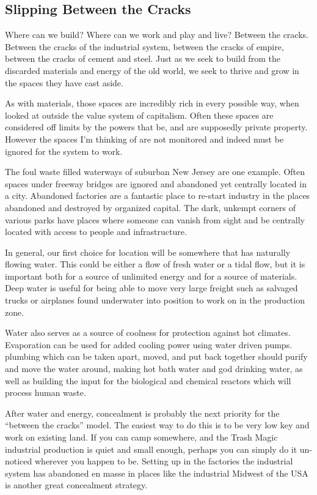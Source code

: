 \subsection{Slipping Between the
Cracks}\label{slipping-between-the-cracks}

Where can we build? Where can we work and play and live? Between the
cracks. Between the cracks of the industrial system, between the cracks
of empire, between the cracks of cement and steel. Just as we seek to
build from the discarded materials and energy of the old world, we seek
to thrive and grow in the spaces they have cast aside.

As with materials, those spaces are incredibly rich in every possible
way, when looked at outside the value system of capitalism. Often these
spaces are considered off limits by the powers that be, and are
supposedly private property. However the spaces I'm thinking of are not
monitored and indeed must be ignored for the system to work.

The foul waste filled waterways of suburban New Jersey are one example.
Often spaces under freeway bridges are ignored and abandoned yet
centrally located in a city. Abandoned factories are a fantastic place
to re-start industry in the places abandoned and destroyed by organized
capital. The dark, unkempt corners of various parks have places where
someone can vanish from sight and be centrally located with access to
people and infrastructure.

In general, our first choice for location will be somewhere that has
naturally flowing water. This could be either a flow of fresh water or a
tidal flow, but it is important both for a source of unlimited energy
and for a source of materials. Deep water is useful for being able to
move very large freight such as salvaged trucks or airplanes found
underwater into position to work on in the production zone.

Water also serves as a source of coolness for protection against hot
climates. Evaporation can be used for added cooling power using water
driven pumps. plumbing which can be taken apart, moved, and put back
together should purify and move the water around, making hot bath water
and god drinking water, as well as building the input for the biological
and chemical reactors which will process human waste.

After water and energy, concealment is probably the next priority for
the ``between the cracks'' model. The easiest way to do this is to be
very low key and work on existing land. If you can camp somewhere, and
the Trash Magic industrial production is quiet and small enough, perhaps
you can simply do it un-noticed wherever you happen to be. Setting up in
the factories the industrial system has abandoned en masse in places
like the industrial Midwest of the USA is another great concealment
strategy.

